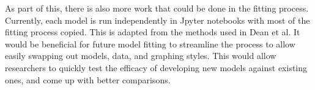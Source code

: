 \documentclass [letterpaper, 12pt] {article}
\begin{document}
As part of this, there is also more work that could be done in the fitting process. Currently, each model is run independently in Jpyter notebooks with most of the fitting process copied. This is adapted from the methods used in Dean et al. It would be beneficial for future model fitting to streamline the process to allow easily swapping out models, data, and graphing styles. This would allow researchers to quickly test the efficacy of developing new models against existing ones, and come up with better comparisons.


\pagebreak



\end{document}
